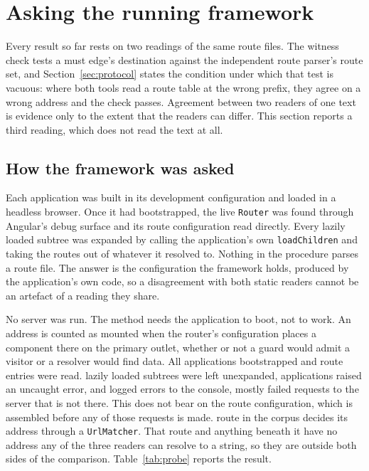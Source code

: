 \section{Asking the running framework}
\label{sec:res-probe}

Every result so far rests on two readings of the same route files. The witness check tests a must edge's destination against the independent route parser's route set, and Section~\ref{sec:protocol} states the condition under which that test is vacuous: where both tools read a route table at the wrong prefix, they agree on a wrong address and the check passes. Agreement between two readers of one text is evidence only to the extent that the readers can differ. This section reports a third reading, which does not read the text at all.

\subsection{How the framework was asked}

Each application was built in its development configuration and loaded in a headless browser. Once it had bootstrapped, the live \texttt{Router} was found through Angular's debug surface and its route configuration read directly. Every lazily loaded subtree was expanded by calling the application's own \texttt{loadChildren} and taking the routes out of whatever it resolved to. Nothing in the procedure parses a route file. The answer is the configuration the framework holds, produced by the application's own code, so a disagreement with both static readers cannot be an artefact of a reading they share.

No server was run. The method needs the application to boot, not to work. An address is counted as mounted when the router's configuration places a component there on the primary outlet, whether or not a guard would admit a visitor or a resolver would find data. All \ProbeApps{} applications bootstrapped and \ProbeRoutes{} route entries were read. \ProbeLazyFailures{} lazily loaded subtrees were left unexpanded, \ProbePageErrorApps{} applications raised an uncaught error, and \ProbeConsoleErrorApps{} logged errors to the console, mostly failed requests to the server that is not there. This does not bear on the route configuration, which is assembled before any of those requests is made. \ProbeMatcherRoutes{} route in the corpus decides its address through a \texttt{UrlMatcher}. That route and anything beneath it have no address any of the three readers can resolve to a string, so they are outside both sides of the comparison. Table~\ref{tab:probe} reports the result.

